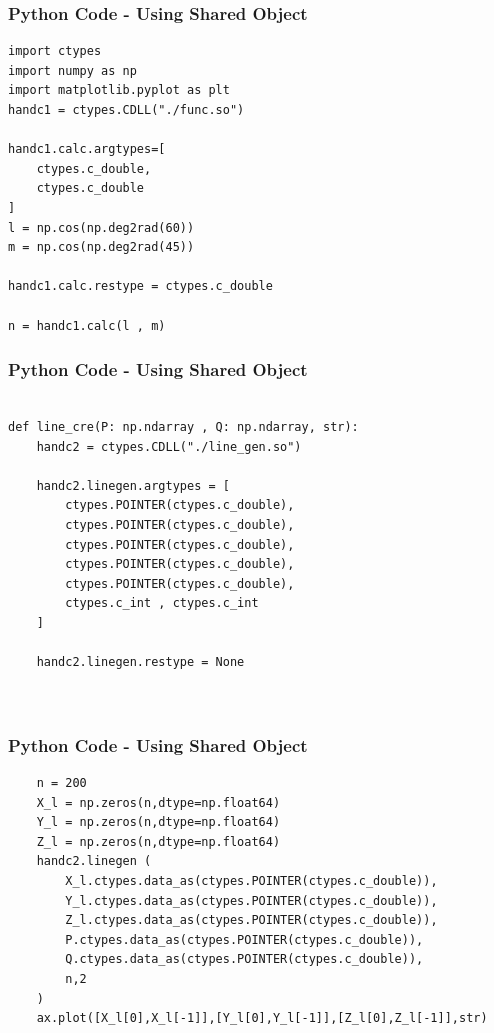 \documentclass{beamer}
\begin{document}
\begin{frame}[fragile]
    \frametitle{Python Code - Using Shared Object}
    \begin{lstlisting}
import ctypes
import numpy as np
import matplotlib.pyplot as plt
handc1 = ctypes.CDLL("./func.so")

handc1.calc.argtypes=[
    ctypes.c_double,
    ctypes.c_double
]
l = np.cos(np.deg2rad(60))
m = np.cos(np.deg2rad(45))

handc1.calc.restype = ctypes.c_double

n = handc1.calc(l , m)
\end{lstlisting}
\end{frame}


\begin{frame}[fragile]
    \frametitle{Python Code - Using Shared Object}
    \begin{lstlisting}

def line_cre(P: np.ndarray , Q: np.ndarray, str):
    handc2 = ctypes.CDLL("./line_gen.so")

    handc2.linegen.argtypes = [
        ctypes.POINTER(ctypes.c_double),
        ctypes.POINTER(ctypes.c_double),
        ctypes.POINTER(ctypes.c_double),
        ctypes.POINTER(ctypes.c_double),
        ctypes.POINTER(ctypes.c_double),
        ctypes.c_int , ctypes.c_int
    ]

    handc2.linegen.restype = None
    


\end{lstlisting}
\end{frame}
\begin{frame}[fragile]
    \frametitle{Python Code - Using Shared Object}
    \begin{lstlisting}
    n = 200
    X_l = np.zeros(n,dtype=np.float64)
    Y_l = np.zeros(n,dtype=np.float64)
    Z_l = np.zeros(n,dtype=np.float64)
    handc2.linegen (
        X_l.ctypes.data_as(ctypes.POINTER(ctypes.c_double)),
        Y_l.ctypes.data_as(ctypes.POINTER(ctypes.c_double)),
        Z_l.ctypes.data_as(ctypes.POINTER(ctypes.c_double)),
        P.ctypes.data_as(ctypes.POINTER(ctypes.c_double)),
        Q.ctypes.data_as(ctypes.POINTER(ctypes.c_double)),
        n,2
    )
    ax.plot([X_l[0],X_l[-1]],[Y_l[0],Y_l[-1]],[Z_l[0],Z_l[-1]],str)

    \end{lstlisting}
\end{frame}
\end{document}
